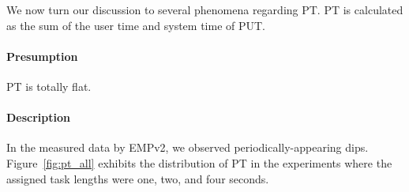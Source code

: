 \documentclass[10pt]{article}
\begin{document}
We now turn our discussion to several phenomena regarding PT. 
PT is calculated as the sum of the user time and system time of PUT. 

\paragraph{Presumption} PT is totally flat. 

\paragraph{Description} 
In the measured data by EMPv2, 
we observed periodically-appearing dips. 
Figure~\ref{fig:pt_all} exhibits the distribution of PT in the experiments 
where the assigned task lengths were one, two, and four seconds. 

\begin{figure}[H]
	\centering
\end{figure}
\end{document}
